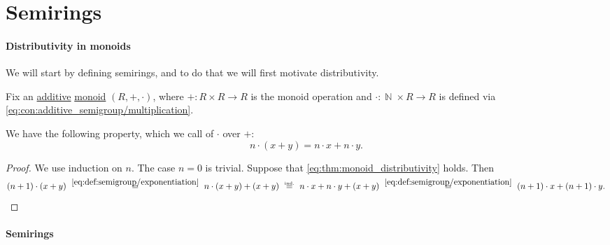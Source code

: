 \section{Semirings}\label{sec:semirings}

\paragraph{Distributivity in monoids}

We will start by defining semirings, and to do that we will first motivate distributivity.

\begin{proposition}\label{thm:monoid_distributivity}
  Fix an \hyperref[con:additive_semigroup/multiplication]{additive} \hyperref[def:monoid]{monoid} \( (R, +, \cdot) \), where \( +: R \times R \to R \) is the monoid operation and \( \cdot: \BbbN \times R \to R \) is defined via \eqref{eq:con:additive_semigroup/multiplication}.

  We have the following property, which we call  of \( \cdot \) over \( + \):
  \begin{equation}\label{eq:thm:monoid_distributivity}
    n \cdot (x + y) = n \cdot x + n \cdot y.
  \end{equation}
\end{proposition}
\begin{proof}
  We use induction on \( n \). The case \( n = 0 \) is trivial. Suppose that \eqref{eq:thm:monoid_distributivity} holds. Then
  \begin{equation*}
    (n + 1) \cdot (x + y)
    \reloset {\eqref{eq:def:semigroup/exponentiation}} =
    n \cdot (x + y) + (x + y)
    \reloset {\T{ind.}} =
    n \cdot x + n \cdot y + (x + y)
    \reloset {\eqref{eq:def:semigroup/exponentiation}} =
    (n + 1) \cdot x + (n + 1) \cdot y.
  \end{equation*}
\end{proof}

\paragraph{Semirings}

